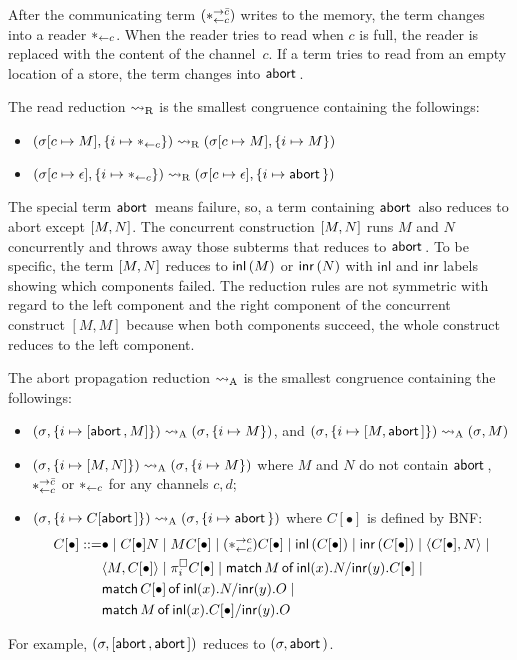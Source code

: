 {After the communicating term $(\ast^{\rightarrow {\bar{c}}}_{\leftarrow{c}})$ writes to the memory,
the term changes into a reader $\ast_{\leftarrow{c}}$.  When the reader tries to
read when $c$ is full, the reader is replaced with the content of the
channel~$c$.
If a term tries to read from an empty location of a store,
the term changes into $\mathsf{abort\,}$.
\begin{definition}
 \label{read}
 The read reduction $\rightsquigarrow_{\mathrm R}$ is the smallest congruence
 containing the
 followings:
\begin{itemize}
 \item $({\sigma}{[c\mapsto M]},{\{i\mapsto {\ast_{\leftarrow{c}}}\}})\rightsquigarrow_{\mathrm R} ({\sigma}{[c\mapsto M]},{\{i\mapsto {M}\}})$
 \item $({\sigma}{[c\mapsto \epsilon]},{\{i\mapsto {\ast_{\leftarrow{c}}}\}})
       \rightsquigarrow_{\mathrm R} ({\sigma}{[c\mapsto \epsilon]},{\{i\mapsto {\mathsf{abort\,}}\}})$
\end{itemize}
\end{definition}

The special term $\mathsf{abort\,}$ means failure, so, a term containing $\mathsf{abort\,}$
also reduces to abort except $[{M,N}]$.  The concurrent
construction $[{M,N}]$ runs $M$ and $N$ concurrently and throws
away those subterms that reduces to $\mathsf{abort\,}$.
To be specific, the term $[{M,N}]$ reduces to $\mathsf{inl}\left({M}\right)$
 or $\mathsf{inr}\left({N}\right)$ with $\mathsf{inl}$ and
$\mathsf{inr}$ labels showing which components failed.
The reduction rules are not symmetric with regard to the left component
and the right component of the concurrent construct $[M, M]$ because
when both components succeed, the whole construct reduces to
the left component.
\begin{definition}
 The abort propagation reduction $\rightsquigarrow_{\mathrm A}$ is the smallest
 congruence containing the
 followings:
\begin{itemize}
 \item  $({\sigma}{},{\{i\mapsto {[{\mathsf{abort\,}, M}]}\}})\rightsquigarrow_{\mathrm A}
 ({\sigma}{},{\{i\mapsto {M}\}})$, and
   $({\sigma}{},{\{i\mapsto {[{M,\mathsf{abort\,}}]}\}})\rightsquigarrow_{\mathrm A}
 ({\sigma}{},{{M}})$
 \item $({\sigma}{},{\{i\mapsto {[{M,N}]}\}})\rightsquigarrow_{\mathrm A} ({\sigma}{},{\{i\mapsto {M}\}})$ where
       $M$ and $N$ do not contain $\mathsf{abort\,}$, $\ast^{\rightarrow {\bar{c}}}_{\leftarrow{c}}$ or $\ast_{\leftarrow{c}}$
       for any channels $c,d$;
 \item  $({\sigma}{},{\{i\mapsto {C[\mathsf{abort\,}]}\}})\rightsquigarrow_{\mathrm A}
 ({\sigma}{},{\{i\mapsto {\mathsf{abort\,}}\}})$  where $C[\bullet]$ is defined by BNF:
\begin{align*}
  C[\bullet] ::= &\bullet \mid
C[\bullet] N \mid
{M C[\bullet]}\mid
(\ast^{\rightarrow {c}}_{\leftarrow{c}})C[\bullet]\mid
\mathsf{inl}\left({C[\bullet]}\right)\mid
\mathsf{inr}\left({C[\bullet]}\right)\mid
\langle{C[\bullet], N}\rangle\mid \\&
\langle{M, C[\bullet]}\rangle\mid
\pi^\square_i{C[\bullet]}\mid
\mathsf{match}\,{M}\,\mathsf{of}\, \mathsf{inl}({x}). {N}/ \mathsf{inr}({y}). {C[\bullet]}\mid\\ &
\mathsf{match}\,{C[\bullet]}\,\mathsf{of}\, \mathsf{inl}({x}). {N}/ \mathsf{inr}({y}). {O}\mid \\&
\mathsf{match}\,{M}\,\mathsf{of}\, \mathsf{inl}({x}). {C[\bullet]}/ \mathsf{inr}({y}). {O}
\end{align*}
\end{itemize}
\end{definition}
For example, $(\sigma, [{\mathsf{abort\,},\mathsf{abort\,}}])$ reduces to $(\sigma,
\mathsf{abort\,})$.

}
